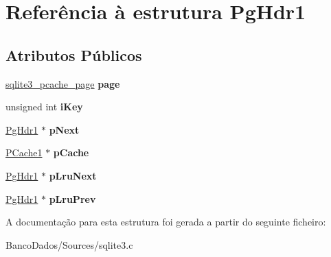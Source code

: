 \hypertarget{struct_pg_hdr1}{\section{Referência à estrutura Pg\-Hdr1}
\label{struct_pg_hdr1}
}
\subsection*{Atributos Públicos}
\begin{DoxyCompactItemize}
\item 
\hypertarget{struct_pg_hdr1_a121a9abbfea6b112ba77eeb84391ed47}{\hyperlink{structsqlite3__pcache__page}{sqlite3\-\_\-pcache\-\_\-page} {\bfseries page}}\label{struct_pg_hdr1_a121a9abbfea6b112ba77eeb84391ed47}

\item 
\hypertarget{struct_pg_hdr1_ad122ef74f5f0137414882aabd111a01b}{unsigned int {\bfseries i\-Key}}\label{struct_pg_hdr1_ad122ef74f5f0137414882aabd111a01b}

\item 
\hypertarget{struct_pg_hdr1_acde43ab0ed0fbba33e526058d9c343b9}{\hyperlink{struct_pg_hdr1}{Pg\-Hdr1} $\ast$ {\bfseries p\-Next}}\label{struct_pg_hdr1_acde43ab0ed0fbba33e526058d9c343b9}

\item 
\hypertarget{struct_pg_hdr1_aa5b23de466773e72e1b6edf07b3a4570}{\hyperlink{struct_p_cache1}{P\-Cache1} $\ast$ {\bfseries p\-Cache}}\label{struct_pg_hdr1_aa5b23de466773e72e1b6edf07b3a4570}

\item 
\hypertarget{struct_pg_hdr1_ae22cfc3a39fe029a8f8fdd70e7ca4055}{\hyperlink{struct_pg_hdr1}{Pg\-Hdr1} $\ast$ {\bfseries p\-Lru\-Next}}\label{struct_pg_hdr1_ae22cfc3a39fe029a8f8fdd70e7ca4055}

\item 
\hypertarget{struct_pg_hdr1_adf220ef63d6ceb782ac87a08aeb1722d}{\hyperlink{struct_pg_hdr1}{Pg\-Hdr1} $\ast$ {\bfseries p\-Lru\-Prev}}\label{struct_pg_hdr1_adf220ef63d6ceb782ac87a08aeb1722d}

\end{DoxyCompactItemize}


A documentação para esta estrutura foi gerada a partir do seguinte ficheiro\-:\begin{DoxyCompactItemize}
\item 
Banco\-Dados/\-Sources/sqlite3.\-c\end{DoxyCompactItemize}
